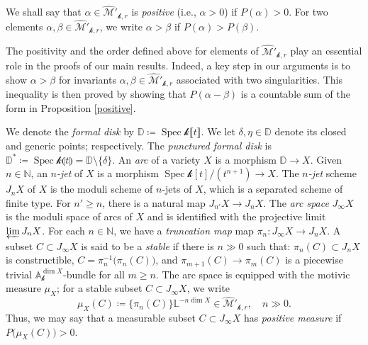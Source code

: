 \documentclass[12pt]{amsart}
\theoremstyle{plain}   %
\theoremstyle{definition}    %
\theoremstyle{remark}    %
\numberwithin{equation}{theorem}
\DeclareMathOperator{\Spec}{{Spec}}
\newcommand{\kay}{\mathcal{k}}
\newcommand{\sM}{\mathcal{M}}
\newcommand{\bA}{\mathbb{A}}
\newcommand{\bD}{\mathbb{D}}
\newcommand{\bL}{\mathbb{L}}
\newcommand{\bN}{\mathbb{N}}
\begin{document}
\begin{definition}
We shall say that $\alpha \in \hat{\sM}'_{\kay,r}$ is \emph{positive} (i.e., $\alpha >0$) if $P(\alpha) >0$.
For two elements $\alpha, \beta \in \hat{\sM}'_{\kay,r}$, we write $\alpha > \beta$ if $P(\alpha)>P(\beta)$. 
\end{definition}

The positivity and the order defined above for elements of $\hat{\sM}'_{\kay,r}$ play an essential role in the proofs of our main results. Indeed, a key step in our arguments is to show $\alpha > \beta$ for  invariants $\alpha,\beta \in \hat{\sM}'_{\kay,r}$ associated with two singularities. This inequality is then proved by showing that $P(\alpha -\beta)$
is a countable sum of the form in Proposition \ref{positive}.

We denote the \emph{formal disk} by $\bD\coloneqq \Spec \kay\llbracket t \rrbracket $. We let $\delta,\eta \in \bD$ denote its closed and generic points; respectively. The \emph{punctured formal disk} is $\bD^* \coloneqq \Spec \kay \llparenthesis t \rrparenthesis=\bD\setminus \{\delta\}$. An \emph{arc} of a variety $X$ is a morphism $\bD \to X$. Given $n \in \bN$, an \emph{$n$-jet} of $X$ is a morphism $\Spec \kay [t]/(t^{n+1}) \to X$. The \emph{$n$-jet} scheme $J_n X$ of $X$ is the moduli scheme of $n$-jets of $X$, which is a separated scheme of finite type. For $n'\ge n$, there is a natural map $J_{n'} X\to J_n X$. The \emph{arc space} $J_\infty X$ is the moduli space of arcs of $X$ and is identified with the projective limit $\varprojlim J_n X$. For each $n \in \bN$, we have a \emph{truncation map} map $\pi _n \colon J_\infty X \to J_n X$. A subset $C \subset J_{\infty} X$ is said to be a \emph{stable} if there is $n \gg 0$ such that: $\pi_n(C)\subset J_nX$ is constructible, $C=\pi_n^{-1}\big(\pi_n(C)\big)$, and $\pi_{m+1}(C) \to \pi_m(C)$ is a piecewise trivial $\bA^{\dim X}_{\kay}$-bundle for all $m \geq n$. The arc space is equipped with the motivic measure $\mu_X$; for a stable subset $C\subset J_\infty X$, we write 
\begin{equation} \label{eqn.MeasureStableSubset}
\mu_X(C)\coloneqq \{\pi_n(C)\}\bL^{-n\dim X} \in \hat{\sM}'_{\kay,r},\quad n\gg 0.
\end{equation} 
Thus, we may say that a measurable subset $C\subset J_{\infty}X$ has
\emph{positive measure }if $P\big(\mu_{X}(C)\big)>0$. 
\end{document}
